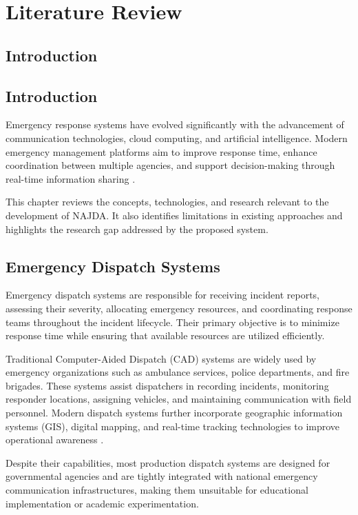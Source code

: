 \chapter{Literature Review}
\label{chap:literature_review}

\section{Introduction}

\section{Introduction}

Emergency response systems have evolved significantly with the advancement of communication technologies, cloud computing, and artificial intelligence. Modern emergency management platforms aim to improve response time, enhance coordination between multiple agencies, and support decision-making through real-time information sharing \cite{pressman2020se,bass2022software}.

This chapter reviews the concepts, technologies, and research relevant to the development of NAJDA. It also identifies limitations in existing approaches and highlights the research gap addressed by the proposed system.

\section{Emergency Dispatch Systems}

Emergency dispatch systems are responsible for receiving incident reports, assessing their severity, allocating emergency resources, and coordinating response teams throughout the incident lifecycle. Their primary objective is to minimize response time while ensuring that available resources are utilized efficiently.

Traditional Computer-Aided Dispatch (CAD) systems are widely used by emergency organizations such as ambulance services, police departments, and fire brigades. These systems assist dispatchers in recording incidents, monitoring responder locations, assigning vehicles, and maintaining communication with field personnel. Modern dispatch systems further incorporate geographic information systems (GIS), digital mapping, and real-time tracking technologies to improve operational awareness \cite{pressman2020se,sommerville2016software}.

Despite their capabilities, most production dispatch systems are designed for governmental agencies and are tightly integrated with national emergency communication infrastructures, making them unsuitable for educational implementation or academic experimentation.

